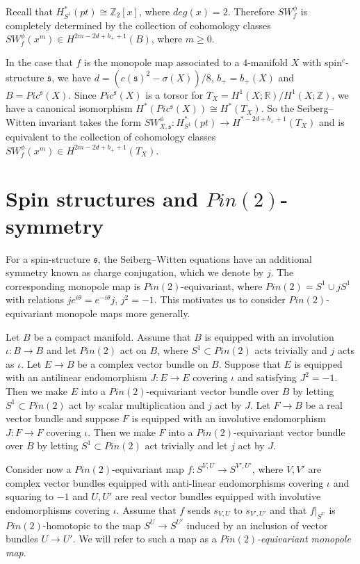 \documentclass{amsart}
\theoremstyle{definition}
\theoremstyle{remark}
\numberwithin{equation}{section}
\begin{document}
Recall that $H^*_{S^1}(pt) \cong \mathbb{Z}_2[x]$, where $deg(x) = 2$. Therefore $SW^\phi_f$ is completely determined by the collection of cohomology classes $SW^\phi_f( x^m) \in H^{2m-2d+b_+ + 1}(B)$, where $m \ge 0$.

In the case that $f$ is the monopole map associated to a $4$-manifold $X$ with spin$^c$-structure $\mathfrak{s}$, we have $d = (c(\mathfrak{s})^2 - \sigma(X))/8$, $b_+ = b_+(X)$ and $B = Pic^{\mathfrak{s}}(X)$. Since $Pic^{\mathfrak{s}}(X)$ is a torsor for $T_X = H^1(X ; \mathbb{R})/H^1(X ; \mathbb{Z})$, we have a canonical isomorphism $H^*(Pic^{\mathfrak{s}}(X)) \cong H^*(T_X)$. So the Seiberg--Witten invariant takes the form $SW^\phi_{X,\mathfrak{s}} : H^*_{S^1}(pt) \to H^{*-2d+b_++1}(T_X)$ and is equivalent to the collection of cohomology classes $SW^\phi_f(x^m) \in H^{2m-2d+b_+ + 1}(T_X)$.


\section{Spin structures and $Pin(2)$-symmetry}\label{sec:pin2}

For a spin-structure $\mathfrak{s}$, the Seiberg--Witten equations have an additional symmetry known as charge conjugation, which we denote by $j$. The corresponding monopole map is $Pin(2)$-equivariant, where $Pin(2) = S^1 \cup j S^1$ with relations $j e^{i\theta} = e^{-i\theta}j$, $j^2= -1$. This motivates us to consider $Pin(2)$-equivariant monopole maps more generally.

Let $B$ be a compact manifold. Assume that $B$ is equipped with an involution $\iota : B \to B$ and let $Pin(2)$ act on $B$, where $S^1 \subset Pin(2)$ acts trivially and $j$ acts as $\iota$. Let $E \to B$ be a complex vector bundle on $B$. Suppose that $E$ is equipped with an antilinear endomorphism $J : E \to E$ covering $\iota$ and satisfying $J^2 = -1$. Then we make $E$ into a $Pin(2)$-equivariant vector bundle over $B$ by letting $S^1 \subset Pin(2)$ act by scalar multiplication and $j$ act by $J$. Let $F \to B$ be a real vector bundle and suppose $F$ is equipped with an involutive endomorphism $J : F \to F$ covering $\iota$. Then we make $F$ into a $Pin(2)$-equivariant vector bundle over $B$ by letting $S^1 \subset Pin(2)$ act trivially and let $j$ act by $J$.

Consider now a $Pin(2)$-equivariant map $f : S^{V,U} \to S^{V',U'}$, where $V,V'$ are complex vector bundles equipped with anti-linear endomorphisms covering $\iota$ and squaring to $-1$ and $U,U'$ are real vector bundles equipped with involutive endomorphisms covering $\iota$. Assume that $f$ sends $s_{V,U}$ to $s_{V',U'}$ and that $f|_{S^U}$ is $Pin(2)$-homotopic to the map $S^U \to S^{U'}$ induced by an inclusion of vector bundles $U \to U'$. We will refer to such a map as a {\em $Pin(2)$-equivariant monopole map}.
\end{document}
